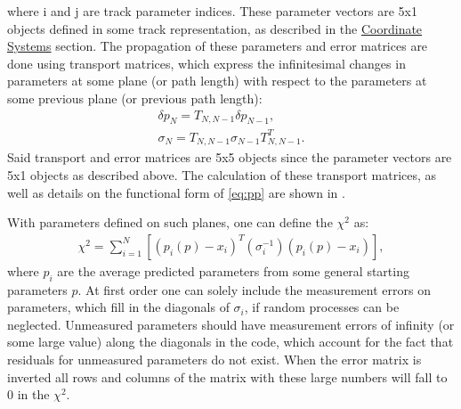     where i and j are track parameter indices. These parameter vectors are 5x1 objects defined in some track representation, as described in the \hyperref[sec:Coord]{Coordinate Systems} section. The propagation of these parameters and error matrices are done using transport matrices, which express the infinitesimal changes in parameters at some plane (or path length) with respect to the parameters at some previous plane (or previous path length):
        \begin{align} \label{eq:transport}
            \delta p_{N} = T_{N,N-1} \delta p_{N-1}, \\
            \sigma_{N} = T_{N,N-1} \sigma_{N-1} T_{N,N-1}^{T}.
        \end{align}
    Said transport and error matrices are 5x5 objects since the parameter vectors are 5x1 objects as described above. The calculation of these transport matrices, as well as details on the functional form of \ref{eq:pp} are shown in \cite{jacob}.

    With parameters defined on such planes, one can define the $\chi^{2}$ as: 
        \begin{align} \label{eq:chi2sum}
            \chi^2 = \sum_{i=1}^{N} [(p_{i}(p)-x_{i})^{T} (\sigma_{i}^{-1}) (p_{i}(p)-x_{i})],
        \end{align}
    where $p_{i}$ are the average predicted parameters from some general starting parameters $p$. At first order one can solely include the measurement errors on parameters, which fill in the diagonals of $\sigma_{i}$, if random processes can be neglected. Unmeasured parameters should have measurement errors of infinity (or some large value) along the diagonals in the code, which account for the fact that residuals for unmeasured parameters do not exist. When the error matrix is inverted all rows and columns of the matrix with these large numbers will fall to 0 in the $\chi^{2}$. 


